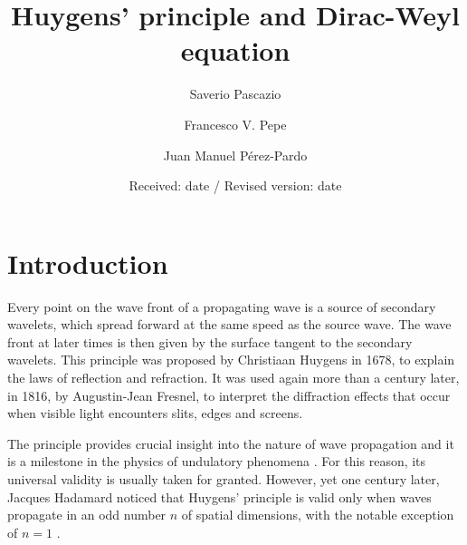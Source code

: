 %
\title{Huygens' principle and Dirac-Weyl equation}
\author{Saverio Pascazio \and Francesco V. Pepe \and Juan Manuel P\'{e}rez-Pardo 
}                     %
%
%
%
\date{Received: date / Revised version: date}
%
%
\maketitle
%
\section{Introduction}
\label{intro}
Every point on the wave front of a propagating wave is a source of secondary wavelets, which spread forward at the same speed as the source wave. The wave front at later times is then given by the surface tangent to the secondary wavelets. This principle was proposed by Christiaan Huygens in 1678, to explain the laws of reflection and refraction. It was used again more than a century later, in 1816, by Augustin-Jean Fresnel, to interpret the diffraction effects that occur when visible light encounters slits, edges and screens. 

The principle provides crucial insight into the nature of wave propagation and it is a milestone in the physics of undulatory phenomena \cite{BornWolf}. For this reason, its universal validity is usually taken for granted. However, yet one century later, Jacques Hadamard noticed that Huygens' principle is valid only when waves propagate in an odd number $n$ of spatial dimensions, with the notable exception of $n=1$ \cite{Hadamard}.

